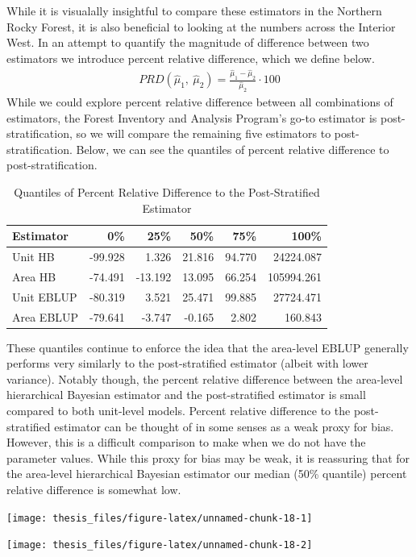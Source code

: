 \documentclass[12pt,twoside]{reedthesis}
\begin{document}
While it is visualally insightful to compare these estimators in the Northern Rocky Forest, it is also beneficial to looking at the numbers across the Interior West. In an attempt to quantify the magnitude of difference between two estimators we introduce percent relative difference, which we define below.
\begin{align*}
PRD(\hat\mu_1,~ \hat\mu_2) = \frac{\hat \mu_1 - \hat\mu_2}{\hat\mu_2} \cdot 100
\end{align*}
While we could explore percent relative difference between all combinations of estimators, the Forest Inventory and Analysis Program's go-to estimator is post-stratification, so we will compare the remaining five estimators to post-stratification. Below, we can see the quantiles of percent relative difference to post-stratification.
\begin{longtable}[t]{lrrrrr}
\caption{\label{tab:unnamed-chunk-17}Quantiles of Percent Relative Difference to the Post-Stratified Estimator}\\
\toprule
Estimator & 0\% & 25\% & 50\% & 75\% & 100\%\\
\midrule
Unit HB & -99.928 & 1.326 & 21.816 & 94.770 & 24224.087\\
Area HB & -74.491 & -13.192 & 13.095 & 66.254 & 105994.261\\
Unit EBLUP & -80.319 & 3.521 & 25.471 & 99.885 & 27724.471\\
Area EBLUP & -79.641 & -3.747 & -0.165 & 2.802 & 160.843\\
\bottomrule
\end{longtable}
These quantiles continue to enforce the idea that the area-level EBLUP generally performs very similarly to the post-stratified estimator (albeit with lower variance). Notably though, the percent relative difference between the area-level hierarchical Bayesian estimator and the post-stratified estimator is small compared to both unit-level models. Percent relative difference to the post-stratified estimator can be thought of in some senses as a weak proxy for bias. However, this is a difficult comparison to make when we do not have the parameter values. While this proxy for bias may be weak, it is reassuring that for the area-level hierarchical Bayesian estimator our median (50\% quantile) percent relative difference is somewhat low.
\begin{center}\texttt{[image: thesis\_files/figure-latex/unnamed-chunk-18-1]} \end{center}
\begin{center}\texttt{[image: thesis\_files/figure-latex/unnamed-chunk-18-2]} \end{center}
\end{document}
